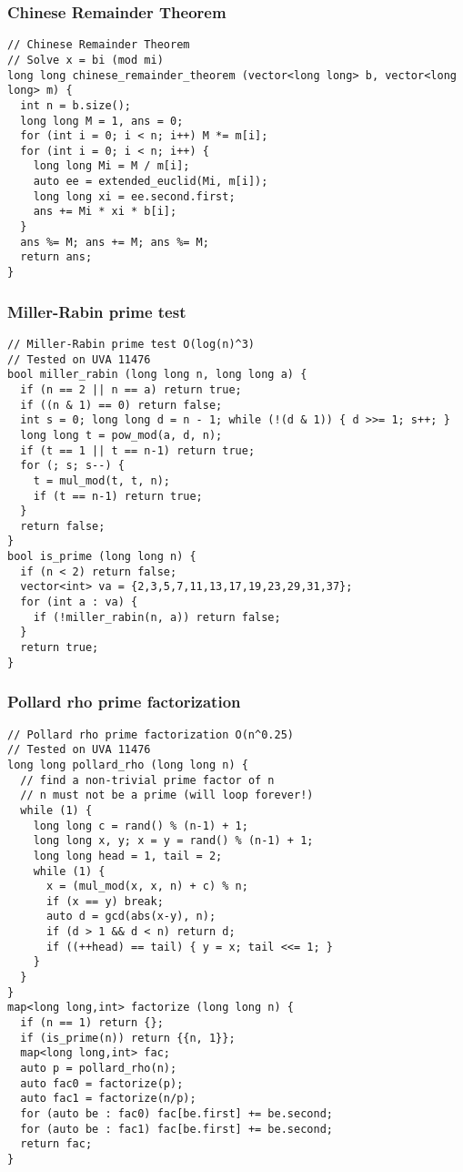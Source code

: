 \documentclass[10pt,landscape]{article}
\begin{document}
\begin{multicols}{2}
\subsubsection{Chinese Remainder Theorem}
\begin{lstlisting}
// Chinese Remainder Theorem
// Solve x = bi (mod mi)
long long chinese_remainder_theorem (vector<long long> b, vector<long long> m) {
  int n = b.size();
  long long M = 1, ans = 0;
  for (int i = 0; i < n; i++) M *= m[i];
  for (int i = 0; i < n; i++) {
    long long Mi = M / m[i];
    auto ee = extended_euclid(Mi, m[i]);
    long long xi = ee.second.first;
    ans += Mi * xi * b[i];
  }
  ans %= M; ans += M; ans %= M;
  return ans;
}
\end{lstlisting}
\subsubsection{Miller-Rabin prime test}
\begin{lstlisting}
// Miller-Rabin prime test O(log(n)^3)
// Tested on UVA 11476
bool miller_rabin (long long n, long long a) {
  if (n == 2 || n == a) return true;
  if ((n & 1) == 0) return false;
  int s = 0; long long d = n - 1; while (!(d & 1)) { d >>= 1; s++; }
  long long t = pow_mod(a, d, n);
  if (t == 1 || t == n-1) return true;
  for (; s; s--) {
    t = mul_mod(t, t, n);
    if (t == n-1) return true;
  }
  return false;
}
bool is_prime (long long n) {
  if (n < 2) return false;
  vector<int> va = {2,3,5,7,11,13,17,19,23,29,31,37};
  for (int a : va) {
    if (!miller_rabin(n, a)) return false;
  }
  return true;
}
\end{lstlisting}
\subsubsection{Pollard rho prime factorization}
\begin{lstlisting}
// Pollard rho prime factorization O(n^0.25)
// Tested on UVA 11476
long long pollard_rho (long long n) {
  // find a non-trivial prime factor of n
  // n must not be a prime (will loop forever!)
  while (1) {
    long long c = rand() % (n-1) + 1;
    long long x, y; x = y = rand() % (n-1) + 1;
    long long head = 1, tail = 2;
    while (1) {
      x = (mul_mod(x, x, n) + c) % n;
      if (x == y) break;
      auto d = gcd(abs(x-y), n);
      if (d > 1 && d < n) return d;
      if ((++head) == tail) { y = x; tail <<= 1; }
    }
  }
}
map<long long,int> factorize (long long n) {
  if (n == 1) return {};
  if (is_prime(n)) return {{n, 1}};
  map<long long,int> fac;
  auto p = pollard_rho(n);
  auto fac0 = factorize(p);
  auto fac1 = factorize(n/p);
  for (auto be : fac0) fac[be.first] += be.second;
  for (auto be : fac1) fac[be.first] += be.second;
  return fac;
}
\end{lstlisting}

\end{multicols}
\end{document}
